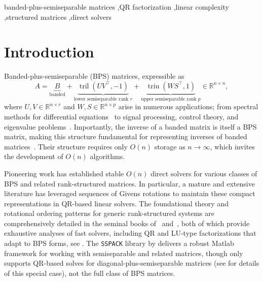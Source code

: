 \documentclass[a4paper,fleqn]{cas-sc}
\def\bbR{{\mathbb R}}
\DeclareMathOperator{\triu}{triu}
\DeclareMathOperator{\tril}{tril}
\begin{document}
\begin{keywords}
banded-plus-semiseparable matrices \sep QR factorization \sep linear complexity \sep structured matrices \sep direct solvers
\end{keywords}


\maketitle

\section{Introduction}

Banded-plus-semiseparable (BPS) matrices, expressible as
\begin{equation*}
A = \underbrace{B}_{\text{banded}} + \underbrace{\tril(UV^\top, -1)}_{\text{lower semiseparable rank } r} + \underbrace{\triu(WS^\top, 1)}_{\text{upper semiseparable rank } p} \in \bbR^{n \times n},
\end{equation*}
where $U ,V \in \bbR^{n \times r}$ and $W,S \in \bbR^{n\times p}$
 arise in numerous applications; from spectral methods for differential equations~\citep{iserles2025stable} to signal processing, control theory, and eigenvalue problems~\citep{vandebril2005note}. Importantly, the inverse of a banded matrix is itself a BPS matrix, making this structure fundamental for representing inverses of banded matrices~\citep{rozsa1991band}. Their structure requires only $O(n)$ storage as $n \rightarrow \infty$, which invites the development of \( O(n) \) algorithms.
 

Pioneering work has established stable $O(n)$ direct solvers for various classes of BPS and related rank-structured matrices. In particular, a mature and extensive literature has leveraged sequences of Givens rotations to maintain these compact representations in QR-based linear solvers. The foundational theory and rotational ordering patterns for generic rank-structured systems are comprehensively detailed in the seminal books of~\cite{vandebril2008matrix} and~\cite{eidelman2014separable}, both of which provide exhaustive analyses of fast solvers, including QR and LU-type factorizations that adapt to BPS forms, see  \cite[p377]{vandebril2008matrix}. The \texttt{SSPACK} library by \cite{vandebrilmanual} delivers a robust Matlab framework for working with semiseparable and related matrices, though only supports QR-based solves for diagonal-plus-semiseparable matrices (see \cite{eidelman1997inversion} for details of this special case), not the full class of BPS matrices.
\end{document}
